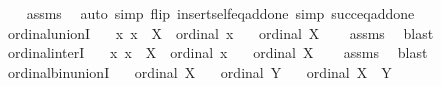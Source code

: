 \begin{isabellebody}
%
\isadelimproof
\ \ %
\endisadelimproof
%
\isatagproof
{}\isamarkupfalse%
\ assms\ \isamarkupfalse%
\ {\isacharparenleft}{\kern0pt}auto\ simp\ flip{\isacharcolon}{\kern0pt}\ insert{\isacharunderscore}{\kern0pt}self{\isacharunderscore}{\kern0pt}eq{\isacharunderscore}{\kern0pt}add{\isacharunderscore}{\kern0pt}one\ simp{\isacharcolon}{\kern0pt}\ succ{\isacharunderscore}{\kern0pt}eq{\isacharunderscore}{\kern0pt}add{\isacharunderscore}{\kern0pt}one{\isacharparenright}{\kern0pt}%
\endisatagproof
{\isafoldproof}%
%
\isadelimproof
\isanewline
%
\endisadelimproof
\isanewline
{}\isamarkupfalse%
\ ordinal{\isacharunderscore}{\kern0pt}unionI{\isacharcolon}{\kern0pt}\isanewline
\ \ \ {\isachardoublequoteopen}{\isasymAnd}x{\isachardot}{\kern0pt}\ x\ {\isasymin}\ X\ {\isasymLongrightarrow}\ ordinal\ x{\isachardoublequoteclose}\isanewline
\ \ \ {\isachardoublequoteopen}ordinal\ {\isacharparenleft}{\kern0pt}{\isasymUnion}X{\isacharparenright}{\kern0pt}{\isachardoublequoteclose}\isanewline
%
\isadelimproof
\ \ %
\endisadelimproof
%
\isatagproof
{}\isamarkupfalse%
\ assms\ \isamarkupfalse%
\ blast%
\endisatagproof
{\isafoldproof}%
%
\isadelimproof
\isanewline
%
\endisadelimproof
\isanewline
{}\isamarkupfalse%
\ ordinal{\isacharunderscore}{\kern0pt}interI{\isacharcolon}{\kern0pt}\isanewline
\ \ \ {\isachardoublequoteopen}{\isasymAnd}x{\isachardot}{\kern0pt}\ x\ {\isasymin}\ X\ {\isasymLongrightarrow}\ ordinal\ x{\isachardoublequoteclose}\isanewline
\ \ \ {\isachardoublequoteopen}ordinal\ {\isacharparenleft}{\kern0pt}{\isasymInter}X{\isacharparenright}{\kern0pt}{\isachardoublequoteclose}\isanewline
%
\isadelimproof
\ \ %
\endisadelimproof
%
\isatagproof
{}\isamarkupfalse%
\ assms\ \isamarkupfalse%
\ blast%
\endisatagproof
{\isafoldproof}%
%
\isadelimproof
\isanewline
%
\endisadelimproof
\isanewline
{}\isamarkupfalse%
\ ordinal{\isacharunderscore}{\kern0pt}bin{\isacharunderscore}{\kern0pt}unionI{\isacharcolon}{\kern0pt}\isanewline
\ \ \ {\isachardoublequoteopen}ordinal\ X{\isachardoublequoteclose}\isanewline
\ \ \ {\isachardoublequoteopen}ordinal\ Y{\isachardoublequoteclose}\isanewline
\ \ \ {\isachardoublequoteopen}ordinal\ {\isacharparenleft}{\kern0pt}X\ {\isasymunion}\ Y{\isacharparenright}{\kern0pt}{\isachardoublequoteclose}\isanewline
%
\isadelimproof
\ \ %
\endisadelimproof
%
\isatagproof
{}\isamarkupfalse%

\end{isabellebody}
